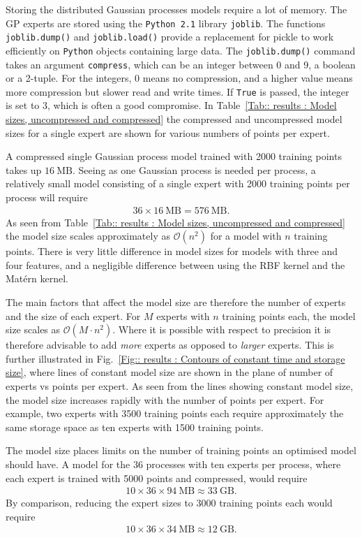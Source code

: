 \documentclass[twoside,english]{uiofysmaster}
\begin{document}
{{Storing the distributed Gaussian processes models require a lot of memory. The GP experts are stored using the \verb|Python 2.1| library \verb|joblib|. The functions \verb|joblib.dump()| and \verb|joblib.load()| provide a replacement for pickle to work efficiently on \verb|Python| objects containing large data. The \verb|joblib.dump()| command takes an argument \verb|compress|, which can be an integer between 0 and 9, a boolean or a 2-tuple. For the integers, 0 means no compression, and a higher value means more compression but slower read and write times. If \verb|True| is passed, the integer is set to 3, which is often a good compromise. In Table~\ref{Tab:: results : Model sizes, uncompressed and compressed} the compressed and uncompressed model sizes for a single expert are shown for various numbers of points per expert.

A compressed single Gaussian process model trained with 2000 training points takes up $16~\mathrm{MB}$. Seeing as one Gaussian process is needed per process, a relatively small model consisting of a single expert with 2000 training points per process will require
\begin{align*}
36 \times 16~ \text{MB} = 576~\text{MB}.
\end{align*}
As seen from Table~\ref{Tab:: results : Model sizes, uncompressed and compressed} the model size scales approximately as $\mathcal{O}( n^2)$ for a model with $n$ training points. There is very little difference in model sizes for models with three and four features, and a negligible difference between using the RBF kernel and the Mat\'{e}rn kernel. 

The main factors that affect the model size are therefore the number of experts and the size of each expert. For $M$ experts with $n$ training points each, the model size scales as $\mathcal{O}(M\cdot n^2)$. Where it is possible with respect to precision it is therefore advisable to add \textit{more} experts as opposed to \textit{larger} experts. This is further illustrated in Fig.~\ref{Fig:: results : Contours of constant time and storage size}, where lines of constant model size are shown in the plane of number of experts vs points per expert. As seen from the lines showing constant model size, the model size increases rapidly with the number of points per expert. For example, two experts with 3500 training points each require approximately the same storage space as ten experts with 1500 training points.

The model size places limits on the number of training points an optimised model should have. A model for the 36 processes with ten experts per process, where each expert is trained with 5000 points and compressed, would require
\begin{align*}
10 \times 36 \times 94~\mathrm{MB} \approx 33~\mathrm{GB}. \nonumber
\end{align*}
By comparison, reducing the expert sizes to 3000 training points each would require
\begin{align}
10 \times 36 \times 34~\mathrm{MB} \approx 12~\mathrm{GB}. \nonumber
\end{align}


}}
\end{document}
